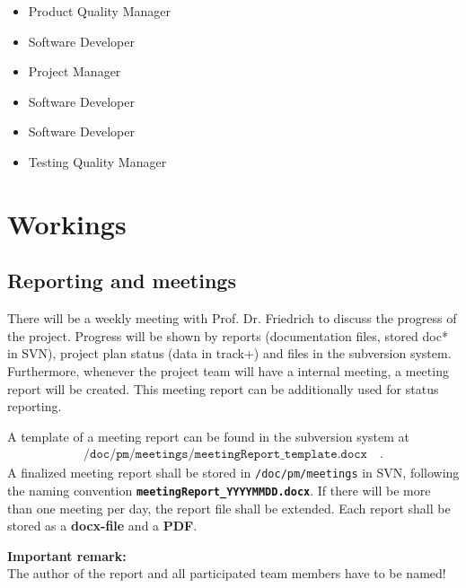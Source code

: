 \begin{itemize}
	\item Product Quality Manager
	\item Software Developer
\end{itemize}


\begin{itemize}
	\item Project Manager
	\item Software Developer
\end{itemize}


\begin{itemize}
	\item Software Developer
	\item Testing Quality Manager
\end{itemize}

\chapter{Workings}
\label{sec:work}

\section{Reporting and meetings}
\label{sec:work:report}
There will be a weekly meeting with Prof. Dr. Friedrich to discuss the progress of the project. Progress will be shown by reports (documentation files, stored \/doc\/* in SVN), project plan status (data in track+) and files in the subversion system. Furthermore, whenever the project team will have a internal meeting, a meeting report will be created. This meeting report can be additionally used for status reporting.

A template of a meeting report can be found in the subversion system at
\begin{align*}
\texttt{/doc/pm/meetings/meetingReport\_template.docx} \quad.
\end{align*}A finalized meeting report shall be stored in \texttt{/doc/pm/meetings} in SVN, following the naming convention \textbf{\texttt{meetingReport\_YYYYMMDD.docx}}. If there will be more than one meeting per day, the report file shall be extended. Each report shall be stored as a \textbf{docx-file} and a \textbf{PDF}.

\textbf{Important remark:}\\
The author of the report and all participated team members have to be named!

